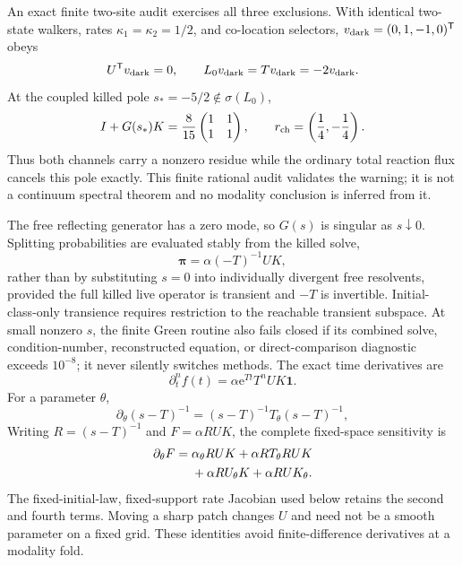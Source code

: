 \documentclass[aps,pre,reprint,amsmath,amssymb,longbibliography,floatfix]{revtex4-2}
\newcommand{\e}{\mathrm e}
\begin{document}
An exact finite two-site audit exercises all three exclusions. With identical
two-state walkers, rates \(\kappa_1=\kappa_2=1/2\), and co-location selectors,
\(v_{\rm dark}=(0,1,-1,0)^\mathsf T\) obeys
\begin{equation}
U^\mathsf Tv_{\rm dark}=0,\qquad
L_0v_{\rm dark}=Tv_{\rm dark}=-2v_{\rm dark}.
\label{eq:dark-mode-fixture}
\end{equation}
At the coupled killed pole \(s_*=-5/2\notin\sigma(L_0)\),
\begin{equation}
I+G(s_*)K=\frac{8}{15}
\begin{pmatrix}1&1\\1&1\end{pmatrix},
\qquad r_{\rm ch}=\left(\frac14,-\frac14\right).
\label{eq:residue-cancellation-fixture}
\end{equation}
Thus both channels carry a nonzero residue while the ordinary total reaction
flux cancels this pole exactly. This finite rational audit validates the
warning; it is not a continuum spectral theorem and no modality conclusion is
inferred from it.

The free reflecting generator has a zero mode, so \(G(s)\) is singular as
\(s\downarrow0\). Splitting probabilities are evaluated stably from the
killed solve,
\begin{equation}
\bm\pi=\alpha(-T)^{-1}UK,
\label{eq:splitting-killed}
\end{equation}
rather than by substituting \(s=0\) into individually divergent free
resolvents, provided the full killed live operator is transient and
\(-T\) is invertible. Initial-class-only transience requires restriction to the
reachable transient subspace. At small nonzero \(s\), the finite Green routine
also fails closed if its combined solve, condition-number, reconstructed
equation, or direct-comparison diagnostic exceeds \(10^{-8}\); it never
silently switches methods. The exact time derivatives are
\begin{equation}
\partial_t^n f(t)=\alpha\e^{Tt}T^n UK\bm 1.
\label{eq:time-derivatives}
\end{equation}
For a parameter \(\theta\),
\begin{equation}
\partial_\theta(s-T)^{-1}
=(s-T)^{-1}T_\theta(s-T)^{-1},
\label{eq:resolvent-sensitivity}
\end{equation}
Writing \(R=(s-T)^{-1}\) and \(F=\alpha RUK\), the complete fixed-space
sensitivity is
\begin{align}
\partial_\theta F={}&\alpha_\theta RUK
+\alpha RT_\theta RUK\notag\\
&+\alpha RU_\theta K+\alpha RUK_\theta.
\label{eq:full-resolvent-sensitivity}
\end{align}
The fixed-initial-law, fixed-support rate Jacobian used below retains the
second and fourth terms. Moving a sharp patch changes \(U\) and need not be a
smooth parameter on a fixed grid. These identities avoid finite-difference
derivatives at a modality fold.
\end{document}
